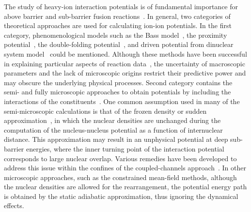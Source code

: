 \documentclass[aps,prc,twocolumn,showpacs,superscriptaddress,longbibliography,nofootinbib,floatfix,10pt]{revtex4-1}
\begin{document}
The study of heavy-ion interaction potentials is of fundamental importance for above barrier and sub-barrier fusion reactions~\cite{Back2014_RMP86-317}.
In general, two categories of theoretical approaches are used for
calculating ion-ion potentials. In the first category, phenomenological models such as the Bass model~\cite{Bass1974_NPA231-45}, the proximity potential~\cite{Randrup1978_PLB77-170,Seiwert1984_PRC29-477}, the double-folding potential~\cite{Satchler1979_PR55-183,Rhoades-Brown1983_PRL50-1435}, and driven potential from dinuclear system model~\cite{Adamian2004_PRC69-044601,
Wang2012_PRC85-041601,Zhu2016_PRC93-064610,Bao2016_PRC93-044615,Feng2018_PRC95-024615} could be mentioned.
 Although these methods have been successful in explaining particular aspects of reaction
data~\cite{Randrup1978_NPA307-319,Fazio2004_EPJA19-89}, the uncertainty of macroscopic parameters and the lack of microscopic origins restrict their predictive power and may obscure the underlying physical processes.
Second category contains the semi- and fully microscopic approaches to obtain potentials by including the interactions of the constituents~\cite{Moller2004_PRL92-072501,Guo2004_NPA740-59,Guo2005_PRC71-024315,Guo2007_PRC76-034317,Lu2014_PRC89-014323}.
One common  assumption used in many of the semi-microscopic calculations is that of the frozen density or sudden approximation~\cite{Brueckner1968_PR173-944}, in which the nuclear densities are unchanged during the computation of the nucleus-nucleus potential as a function of internuclear distance.
This approximation may result in an unphysical potential at deep sub-barrier energies, where the inner turning point of the interaction potential corresponds to large nuclear overlap.
Various remedies have been developed to address this issue within the confines of the coupled-channels approach~\cite{Misicu2006_PRL96-112701,Ichikawa2007_PRC75-057603}.
In other microscopic approaches, such as the constrained mean-field methods, although the nuclear densities are allowed for the rearrangement, the potential energy path is obtained by the static adiabatic approximation, thus ignoring the dynamical effects.
\end{document}
